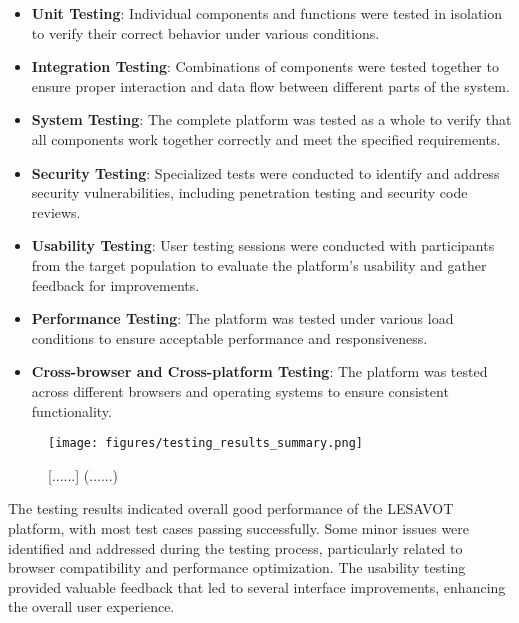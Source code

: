 \documentclass[12pt, a4paper, oneside]{book}
\begin{document}
\begin{itemize}[leftmargin=*]
    \item \textbf{Unit Testing}: Individual components and functions were tested in isolation to verify their correct behavior under various conditions.

    \item \textbf{Integration Testing}: Combinations of components were tested together to ensure proper interaction and data flow between different parts of the system.

    \item \textbf{System Testing}: The complete platform was tested as a whole to verify that all components work together correctly and meet the specified requirements.

    \item \textbf{Security Testing}: Specialized tests were conducted to identify and address security vulnerabilities, including penetration testing and security code reviews.

    \item \textbf{Usability Testing}: User testing sessions were conducted with participants from the target population to evaluate the platform's usability and gather feedback for improvements.

    \item \textbf{Performance Testing}: The platform was tested under various load conditions to ensure acceptable performance and responsiveness.

    \item \textbf{Cross-browser and Cross-platform Testing}: The platform was tested across different browsers and operating systems to ensure consistent functionality.
\end{itemize}

\begin{figure}[htbp]
    \centering
    \texttt{[image: figures/testing\_results\_summary.png]}
    \caption{[......] (......)}
    \label{fig:testing_results}
\end{figure}

The testing results indicated overall good performance of the LESAVOT platform, with most test cases passing successfully. Some minor issues were identified and addressed during the testing process, particularly related to browser compatibility and performance optimization. The usability testing provided valuable feedback that led to several interface improvements, enhancing the overall user experience.
\end{document}
